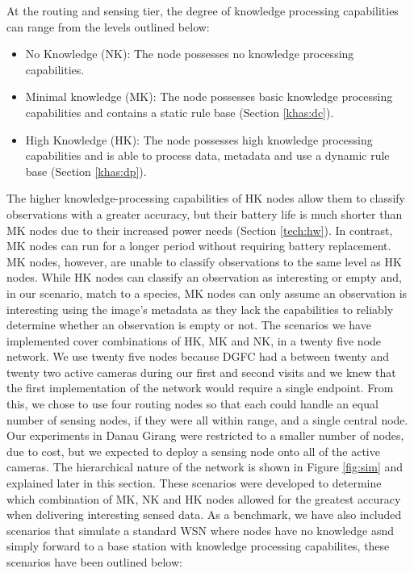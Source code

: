 	At the routing and sensing tier, the degree of knowledge processing capabilities can range from the levels outlined below:
	
	\begin{itemize}
		\item No Knowledge (NK): The node possesses no knowledge processing capabilities.
		\item Minimal knowledge (MK): The node possesses basic knowledge processing capabilities and contains a static rule base (Section \ref{khas:dc}).
		\item High Knowledge (HK): The node possesses high knowledge processing capabilities and is able to process data, metadata and use a dynamic rule base (Section \ref{khas:dp}).
	\end{itemize}
	
	The higher knowledge-processing capabilities of HK nodes allow them to classify observations with a greater accuracy, but their battery life is much shorter than MK nodes due to their increased power needs (Section \ref{tech:hw}). In contrast, MK nodes can run for a longer period without requiring battery replacement. MK nodes, however, are unable to classify observations to the same level as HK nodes. While HK nodes can classify an observation as interesting or empty and, in our scenario, match to a species, MK nodes can only assume an observation is interesting using the image's metadata as they lack the capabilities to reliably determine whether an observation is empty or not. The scenarios we have implemented cover combinations of HK, MK and NK, in a twenty five node network. We use twenty five nodes because DGFC had a between twenty and twenty two active cameras during our first and second visits and we knew that the first implementation of the network would require a single endpoint. From this, we chose to use four routing nodes so that each could handle an equal number of sensing nodes, if they were all within range, and a single central node. Our experiments in Danau Girang were restricted to a smaller number of nodes, due to cost, but we expected to deploy a sensing node onto all of the active cameras. The hierarchical nature of the network is shown in Figure \ref{fig:sim} and explained later in this section. These scenarios were developed to determine which combination of MK, NK and HK nodes allowed for the greatest accuracy when delivering interesting sensed data. As a benchmark, we have also included scenarios that simulate a standard WSN where nodes have no knowledge asnd simply forward to a base station with knowledge processing capabilites, these scenarios have been outlined below:
	
